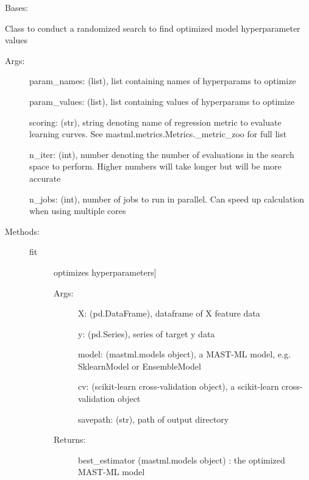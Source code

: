 \documentclass[letterpaper,10pt,english]{sphinxmanual}
\begin{document}
\begin{fulllineitems}
\label{\detokenize{api/mastml.hyper_opt.RandomizedSearch:mastml.hyper_opt.RandomizedSearch}}
Bases: {\hyperref[\detokenize{api/mastml.hyper_opt.HyperOptUtils:mastml.hyper_opt.HyperOptUtils}]{}}

Class to conduct a randomized search to find optimized model hyperparameter values
\begin{description}
\item[{Args:}] \leavevmode
param\_names: (list), list containing names of hyperparams to optimize

param\_values: (list), list containing values of hyperparams to optimize

scoring: (str), string denoting name of regression metric to evaluate learning curves. See mastml.metrics.Metrics.\_metric\_zoo for full list

n\_iter: (int), number denoting the number of evaluations in the search space to perform. Higher numbers will take longer but will be more accurate

n\_jobs: (int), number of jobs to run in parallel. Can speed up calculation when using multiple cores

\item[{Methods:}] \leavevmode\begin{description}
\item[{fit}] \leavevmode{[}optimizes hyperparameters{]}\begin{description}
\item[{Args:}] \leavevmode
X: (pd.DataFrame), dataframe of X feature data

y: (pd.Series), series of target y data

model: (mastml.models object), a MAST-ML model, e.g. SklearnModel or EnsembleModel

cv: (scikit-learn cross-validation object), a scikit-learn cross-validation object

savepath: (str), path of output directory

\item[{Returns:}] \leavevmode
best\_estimator (mastml.models object) : the optimized MAST-ML model


\end{description}
\end{description}
\end{description}
\end{fulllineitems}
\end{document}
